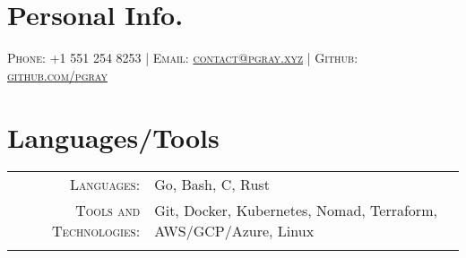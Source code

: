 \documentclass[a4paper, 10pt, onepage]{article} %
\begin{document}
\pagestyle{empty} 
\par{\par}
\par{\par}

\centering\section{Personal Info.}
\centering\textsc{{Phone:} +1 551 254 8253 | {Email:}  \href{mailto:contact@pgray.xyz}{contact@pgray.xyz} | {Github:}  \href{http://github.com/pgray}{github.com/pgray}}\\

\section{Languages/Tools}
\begin{tabular}{rp{10cm}}
\textsc{Languages:} & Go, Bash, C, Rust\\
\textsc{Tools and Technologies:} & Git, Docker, Kubernetes, Nomad, Terraform, AWS/GCP/Azure, Linux\\
\multicolumn{2}{c}{}\\
\end{tabular}
\end{document}
